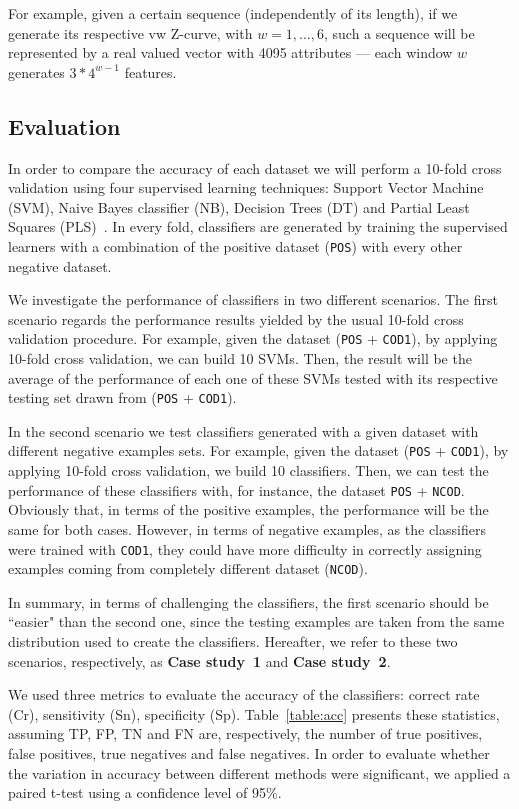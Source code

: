 \documentclass[conference]{IEEEtran}
\begin{document}
For example, given a certain sequence (independently of its length), if we generate its respective vw Z-curve, with $ w = 1, ..., 6 $, such a sequence will be represented by a real valued vector with 4095 attributes --- each window $w$ generates $ 3*4^{w-1} $ features. 

\subsection{Evaluation}

In order to compare the accuracy of each dataset we will perform a 10-fold cross validation using four supervised learning techniques: Support Vector Machine (SVM), Naive Bayes classifier (NB), Decision Trees (DT) and Partial Least Squares (PLS)~\cite{song2011a,mitchell1997}. In every fold, classifiers are generated by training the supervised learners with a combination of the positive dataset ({\tt POS}) with every other negative dataset.

We investigate the performance of classifiers in two different scenarios. The first scenario regards the performance results yielded by the usual 10-fold cross validation procedure. For example, given the dataset ({\tt POS} + {\tt COD1}), by applying 10-fold cross validation, we can build 10 SVMs. Then, the result will be the average of the performance of each one of these SVMs tested with its respective testing set drawn from ({\tt POS} + {\tt COD1}).

In the second scenario we test classifiers generated with a given dataset with different negative examples sets. For example, given the dataset ({\tt POS} + {\tt COD1}), by applying 10-fold cross validation, we build 10 classifiers. Then, we can test the performance of these classifiers with, for instance, the dataset {\tt POS} + {\tt NCOD}. Obviously that, in terms of the positive examples, the performance will be the same for both cases. However, in terms of negative examples, as the classifiers were trained with {\tt COD1}, they could have more difficulty in correctly assigning examples coming from completely different dataset ({\tt NCOD}).

In summary, in terms of challenging the classifiers, the first scenario should be ``easier" than the second one, since the testing examples are taken from the same distribution used to create the classifiers. Hereafter, we refer to these two scenarios, respectively, as {\bf Case study~1} and {\bf Case study~2}.

We used three metrics to evaluate the accuracy of the classifiers: correct rate (Cr), sensitivity (Sn), specificity (Sp). Table~\ref{table:acc} presents these statistics, assuming TP, FP, TN and FN are, respectively, the number of true positives, false positives, true negatives and false negatives. In order to evaluate whether the variation in accuracy between different methods were significant, we applied a paired t-test using a confidence level of 95\%.
\end{document}
